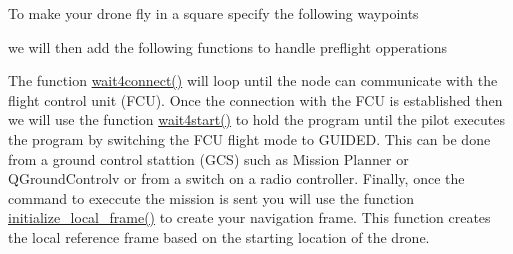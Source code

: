 To make your drone fly in a square specify the following waypoints 
\begin{DoxyCode}{0}
\end{DoxyCode}
 we will then add the following functions to handle preflight opperations 
\begin{DoxyCode}{0}
\DoxyCodeLine{}
\DoxyCodeLine{}
\end{DoxyCode}
 The function {\ttfamily \mbox{\hyperlink{group__control__functions_ga1921a30d419eb397f7e40875217b45d1}{wait4connect()}}} will loop until the node can communicate with the flight control unit (F\+CU). Once the connection with the F\+CU is established then we will use the function {\ttfamily \mbox{\hyperlink{group__control__functions_gab6fe46f505ab9804b4ed98b96286a811}{wait4start()}}} to hold the program until the pilot executes the program by switching the F\+CU flight mode to G\+U\+I\+D\+ED. This can be done from a ground control stattion (G\+CS) such as Mission Planner or Q\+Ground\+Controlv or from a switch on a radio controller. Finally, once the command to execcute the mission is sent you will use the function {\ttfamily \mbox{\hyperlink{group__control__functions_ga2a1100bb15673a9322c5be3bb8e9999f}{initialize\+\_\+local\+\_\+frame()}}} to create your navigation frame. This function creates the local reference frame based on the starting location of the drone.

